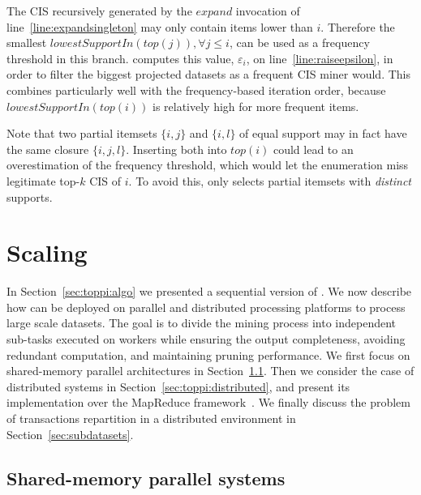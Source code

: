 The CIS recursively generated by the $\mathit{expand}$ invocation of line~\ref{line:expandsingleton}
may only contain items lower than $i$.
Therefore the smallest $\mathit{lowestSupportIn(top(j))}, \forall j \leq i$,
can be used as a frequency threshold in this branch.
\toppi computes this value, $\varepsilon_i$, on line~\ref{line:raiseepsilon},
in order to filter the biggest projected datasets as a frequent CIS miner would.
This combines particularly well with the frequency-based iteration order,
because $\mathit{lowestSupportIn(top(i))}$ is relatively high for more frequent items.

Note that two partial itemsets $\{i,j\}$ and $\{i,l\}$ of equal support
may in fact have the same closure $\{i,j,l\}$.
Inserting both into $\mathit{top(i)}$ could lead to an overestimation of the frequency threshold,
which would let the enumeration miss legitimate top-$k$ CIS of $i$.
To avoid this, \toppi only selects partial itemsets with {\em distinct} supports.















\section{Scaling \toppi}
\label{sec:toppi:hadoop}

In Section~\ref{sec:toppi:algo} we presented a sequential version of \toppi.
We now describe how \toppi can be deployed on parallel and distributed processing platforms
to process large scale datasets.
The goal is to divide the mining process into independent sub-tasks executed on workers while
ensuring the output completeness, avoiding redundant computation, and maintaining pruning performance.
We first focus on shared-memory parallel architectures in Section~\ref{sec:toppi:multithread}.
Then we consider the case of distributed systems in Section~\ref{sec:toppi:distributed},
and present its implementation over the MapReduce framework~\cite{DeanOSDI04}.
We finally discuss the problem of transactions repartition in a distributed environment in Section~\ref{sec:subdatasets}.

\subsection{Shared-memory parallel systems}
\label{sec:toppi:multithread}

